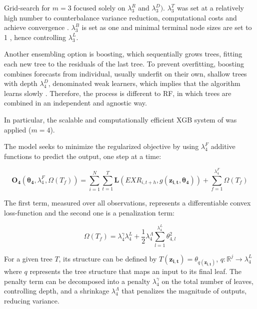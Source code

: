 \documentclass[preprint,12pt,authoryear]{elsarticle}
\begin{document}
Grid-search for $m=3$ focused solely on $\lambda^{R}_{3}$ and $\lambda^{D}_{3})$. $\lambda^{T}_{3}$ was set at a relatively high number to counterbalance variance reduction, computational costs and achieve convergence \citep{probstetal2019}. $\lambda^{B}_{3}$ is set as one and minimal terminal node sizes are set to 1 \citep{wrightziegler2017}, hence controlling $\lambda^{L}_{3}$. 
 
Another ensembling option is boosting, which sequentially grows trees, fitting each new tree to the residuals of the last tree. To prevent overfitting, boosting combines forecasts from individual, usually underfit on their own, shallow trees with depth $\lambda^{D}_{4}$, denominated weak learners, which implies that the algorithm learns slowly \citep{friedman2001}. Therefore, the process is different to RF, in which trees are combined in an independent and agnostic way.     

In particular, the scalable and computationally efficient XGB system of \citet{chenguestrin2016} was applied ($m = 4$).

The model seeks to minimize the regularized objective by using $\lambda^{F}_{4}$ additive functions to predict the output, one step at a time:

\begin{equation}
\label{objxgb}
\mathbf{O_{4}}(\mathbf{\theta_{4}},\lambda^{F}_{4}, \Omega(T_{f})) = \sum_{i=1}^{N}\sum_{t=1}^{T}\mathbf{L}(EXR_{i,t+h}, g(\mathbf{z_{i,t}}, \mathbf{\theta_{4}})) + \sum_{f=1}^{\lambda^{F}_{4}}\Omega(T_{f})
\end{equation}

The first term, measured over all observations, represents a differentiable convex loss-function and the second one is a penalization term:

\begin{equation}
\Omega(T_{f}) = \lambda^{\gamma}_{4}\lambda^{L}_{4} + \frac{1}{2}\lambda^{\Lambda}_{4} \sum_{l=1}^{\lambda^{L}_{4}}\theta_{4,l}^2 
\end{equation}

For a given tree $T$, its structure can be defined by $T(\mathbf{z_{i,t}}) = \theta_{q(\mathbf{z_{i,t}})}$, $q: \mathbb{R}^{j} \rightarrow \lambda^{L}_{4}$ where $q$ represents the tree structure that maps an input to its final leaf. The penalty term can be decomposed into a penalty $\lambda^{\gamma}_{4}$ on the total number of leaves, controlling depth, and a shrinkage $\lambda^{\Lambda}_{4}$ that penalizes the magnitude of outputs, reducing variance. 
\end{document}

